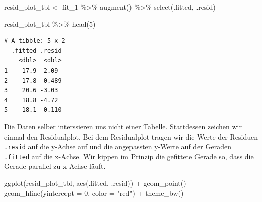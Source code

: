 \documentclass[
  letterpaper,
]{scrbook}
\newenvironment{Shaded}{\begin{snugshade}}{\end{snugshade}}
\newcommand{\AttributeTok}[1]{\textcolor[rgb]{0.40,0.45,0.13}{#1}}
\newcommand{\DecValTok}[1]{\textcolor[rgb]{0.68,0.00,0.00}{#1}}
\newcommand{\FunctionTok}[1]{\textcolor[rgb]{0.28,0.35,0.67}{#1}}
\newcommand{\NormalTok}[1]{\textcolor[rgb]{0.00,0.23,0.31}{#1}}
\newcommand{\OtherTok}[1]{\textcolor[rgb]{0.00,0.23,0.31}{#1}}
\newcommand{\SpecialCharTok}[1]{\textcolor[rgb]{0.37,0.37,0.37}{#1}}
\newcommand{\StringTok}[1]{\textcolor[rgb]{0.13,0.47,0.30}{#1}}
\begin{document}
\begin{Shaded}
\begin{Highlighting}[]
\NormalTok{resid\_plot\_tbl }\OtherTok{\textless{}{-}}\NormalTok{ fit\_1 }\SpecialCharTok{\%\textgreater{}\%} 
  \FunctionTok{augment}\NormalTok{() }\SpecialCharTok{\%\textgreater{}\%} 
  \FunctionTok{select}\NormalTok{(.fitted, .resid)}

\NormalTok{resid\_plot\_tbl }\SpecialCharTok{\%\textgreater{}\%} 
  \FunctionTok{head}\NormalTok{(}\DecValTok{5}\NormalTok{)}
\end{Highlighting}
\end{Shaded}

\begin{verbatim}
# A tibble: 5 x 2
  .fitted .resid
    <dbl>  <dbl>
1    17.9 -2.09 
2    17.8  0.489
3    20.6 -3.03 
4    18.8 -4.72 
5    18.1  0.110
\end{verbatim}

Die Daten selber interssieren uns nicht einer Tabelle. Stattdessen
zeichen wir einmal den Residualplot. Bei dem Residualplot tragen wir die
Werte der Residuen \texttt{.resid} auf die y-Achse auf und die
angepassten y-Werte auf der Geraden \texttt{.fitted} auf die x-Achse.
Wir kippen im Prinzip die gefittete Gerade so, dass die Gerade parallel
zu x-Achse läuft.

\begin{Shaded}
\begin{Highlighting}[]
\FunctionTok{ggplot}\NormalTok{(resid\_plot\_tbl, }\FunctionTok{aes}\NormalTok{(.fitted, .resid)) }\SpecialCharTok{+}
  \FunctionTok{geom\_point}\NormalTok{() }\SpecialCharTok{+}
  \FunctionTok{geom\_hline}\NormalTok{(}\AttributeTok{yintercept =} \DecValTok{0}\NormalTok{, }\AttributeTok{color =} \StringTok{"red"}\NormalTok{) }\SpecialCharTok{+}
  \FunctionTok{theme\_bw}\NormalTok{()}
\end{Highlighting}
\end{Shaded}
\end{document}
